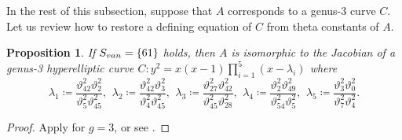 \documentclass{amsart}
\theoremstyle{definition}
\theoremstyle{plain}
\newtheorem{Prop}[Def]{Proposition}
\begin{document}
In the rest of this subsection, suppose that $A$ corresponds to a genus-3 curve $C$.
Let us review how to restore a defining equation of $C$ from theta constants of $A$.
\begin{Prop}\label{hyp_restore}
If $S_{\rm van} = \{61\}$ holds, then $A$ is isomorphic to the Jacobian of a genus-3 hyperelliptic curve $C: y^2 = x(x-1)\prod_{i=1}^5(x-\lambda_i)$ where
\begin{equation}\label{Rosenhain}
    \lambda_1 \coloneqq \frac{\vartheta_{42}^2\vartheta_2^2}{\vartheta_5^2\vartheta_{45}^2},\ \,\lambda_2 \coloneqq \frac{\vartheta_{42}^2\vartheta_3^2}{\vartheta_4^2\vartheta_{45}^2},\ \,\lambda_3 \coloneqq \frac{\vartheta_{27}^2\vartheta_{42}^2}{\vartheta_{45}^2\vartheta_{28}^2},\ \,\lambda_4 \coloneqq \frac{\vartheta_2^2\vartheta_{49}^2}{\vartheta_{54}^2\vartheta_5^2},\ \,\lambda_5 \coloneqq \frac{\vartheta_3^2\vartheta_0^2}{\vartheta_7^2\vartheta_4^2}.
\end{equation}
\end{Prop}
\begin{proof}
Apply \cite[Theorem 1.1]{Takase} for $g=3$, or see \cite[Theorem 4]{Shaska}.
\end{proof}
\end{document}

